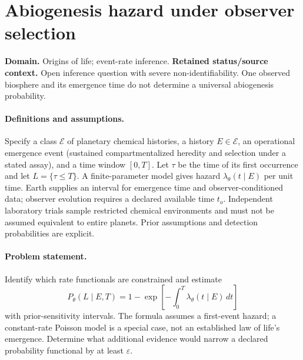 \documentclass[11pt]{article}
\begin{document}
\section*{Abiogenesis hazard under observer selection}
\label{prob:281}
\label{rank:187}
\par\smallskip

\noindent\textbf{Domain.} Origins of life; event-rate inference. \quad \textbf{Retained status/source context.} Open inference question with severe non-identifiability. One observed biosphere and its emergence time do not determine a universal abiogenesis probability.

\paragraph{Definitions and assumptions.} Specify a class $\mathcal E$ of planetary chemical histories, a history $E\in\mathcal E$, an operational emergence event (sustained compartmentalized heredity and selection under a stated assay), and a time window $[0,T]$. Let $\tau$ be the time of its first occurrence and let $L=\{\tau\le T\}$. A finite-parameter model gives hazard $\lambda_\theta(t\mid E)$ per unit time. Earth supplies an interval for emergence time and observer-conditioned data; observer evolution requires a declared available time $t_o$. Independent laboratory trials sample restricted chemical environments and must not be assumed equivalent to entire planets. Prior assumptions and detection probabilities are explicit.

\paragraph{Problem statement.} Identify which rate functionals are constrained and estimate
\[
P_\theta(L\mid E,T)=1-\exp\!\left[-\int_0^T\lambda_\theta(t\mid E)\,dt\right]
\]
with prior-sensitivity intervals. The formula assumes a first-event hazard; a constant-rate Poisson model is a special case, not an established law of life's emergence. Determine what additional evidence would narrow a declared probability functional by at least $\varepsilon$.
\end{document}
